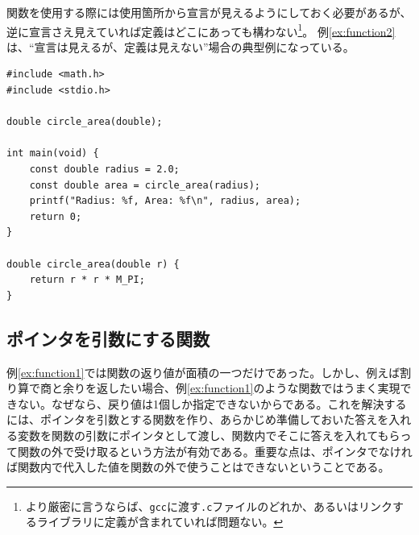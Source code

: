 関数を使用する際には使用箇所から宣言が見えるようにしておく必要があるが、逆に宣言さえ見えていれば定義はどこにあっても構わない\footnote{より厳密に言うならば、\texttt{gcc}に渡す\texttt{.c}ファイルのどれか、あるいはリンクするライブラリに定義が含まれていれば問題ない。}。
例\ref{ex:function2}は、``宣言は見えるが、定義は見えない''場合の典型例になっている。

\begin{reidai}\label{ex:function2}
    \begin{verbatim}
#include <math.h>
#include <stdio.h>

double circle_area(double);

int main(void) {
    const double radius = 2.0;
    const double area = circle_area(radius);
    printf("Radius: %f, Area: %f\n", radius, area);
    return 0;
}

double circle_area(double r) {
    return r * r * M_PI;
}
\end{verbatim}
\end{reidai}

\subsection{ポインタを引数にする関数}

例\ref{ex:function1}では関数の返り値が面積の一つだけであった。しかし、例えば割り算で商と余りを返したい場合、例\ref{ex:function1}のような関数ではうまく実現できない。なぜなら、戻り値は1個しか指定できないからである。これを解決するには、ポインタを引数とする関数を作り、あらかじめ準備しておいた答えを入れる変数を関数の引数にポインタとして渡し、関数内でそこに答えを入れてもらって関数の外で受け取るという方法が有効である。重要な点は、ポインタでなければ関数内で代入した値を関数の外で使うことはできないということである。

